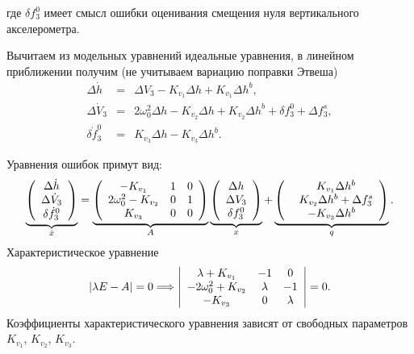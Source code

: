 \documentclass[a4paper,14pt]{article}
\theoremstyle{plain} %
\theoremstyle{definition} %
\theoremstyle{remark} %
\begin{document}
где $\delta f_3^0$ имеет смысл ошибки оценивания смещения нуля вертикального акселерометра.

Вычитаем из модельных уравнений идеальные уравнения, в линейном приближении получим (не учитываем вариацию поправки Этвеша)
\begin{eqnarray*}
    \Delta \dot  h  &=& \Delta V_3 - K_{v_1} \Delta h + K_{v_1} \Delta h^b , \nonumber \\
    \Delta \dot V_3  &=&  2 \omega_0^2 \Delta h - K_{v_2} \Delta h + K_{v_2} \Delta h^b + \delta f_3^0 + \Delta f_3^s , \nonumber \\
    \delta {\dot f}_3^0   &=&  K_{v_3} \Delta h - K_{v_3} \Delta h^b
    .
\end{eqnarray*}

Уравнения ошибок примут вид:
\begin{eqnarray*}
    \underbrace{
        \left(
        \begin{array}{c}
            \Delta \dot h \cr
            \Delta \dot V_3 \cr
            \delta {\dot f}_3^0
        \end{array}
        \right)}_{\dot x}
    =
    \underbrace{
        \left(
        \begin{array}{ccc}
            - K_{v_1}             & 1 & 0  \cr
            2\omega_0^2 - K_{v_2} & 0 & 1  \cr
            K_{v_3}               & 0 & 0
        \end{array}
        \right)
    }_{A}
    \underbrace{
        \left(
        \begin{array}{c}
            \Delta h \cr
            \Delta V_3 \cr
            \delta f_3^0
        \end{array}
        \right)
    }_{x}
    +
    \underbrace{
        \left(
        \begin{array}{c}
            \phantom{-} K_{v_1} \Delta h^b \cr
            \phantom{-} K_{v_2} \Delta h^b + \Delta f_3^s \cr
            -K_{v_3} \Delta h^b
        \end{array}
        \right)
    }_{q}
    .
\end{eqnarray*}
Характеристическое уравнение
\begin{eqnarray*}
    \left| \lambda E- A \right| = 0  \Longrightarrow
    \left|
    \begin{array}{ccc}
        \lambda  + K_{v_1}     & -1      & 0 \cr
        -2\omega_0^2 + K_{v_2} & \lambda & -1 \cr
        - K_{v_3}              & 0       & \lambda
    \end{array}
    \right| = 0 .
\end{eqnarray*}
Коэффициенты характеристического уравнения зависят от свободных параметров $K_{v_1}$, $K_{v_2}$, $K_{v_3}$.
\end{document}
